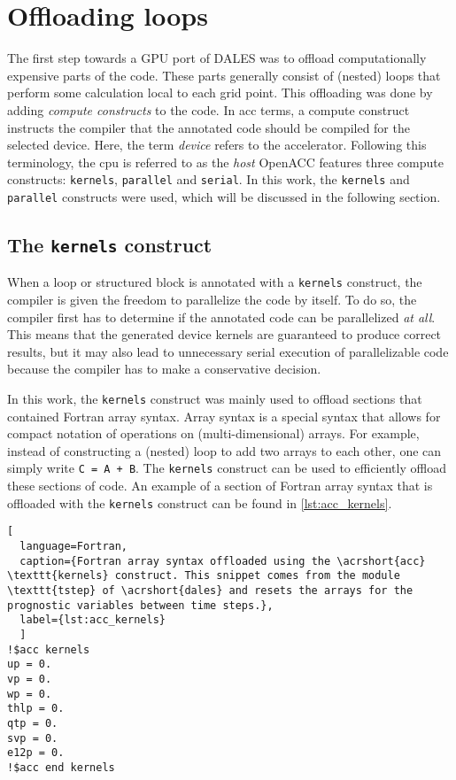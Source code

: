 \section{Offloading loops}
The first step towards a GPU port of DALES was to offload computationally expensive parts of the code. These parts generally consist of (nested) loops that perform some calculation local to each grid point. This offloading was done by adding \emph{compute constructs} to the code. In \acrshort{acc} terms, a compute construct instructs the compiler that the annotated code should be compiled for the selected device. Here, the term \emph{device} refers to the accelerator. Following this terminology, the \acrshort{cpu} is referred to as the \emph{host} OpenACC features three compute constructs: \texttt{kernels}, \texttt{parallel} and \texttt{serial}. In this work, the \texttt{kernels} and \texttt{parallel} constructs were used, which will be discussed in the following section.

\subsection{The \texttt{kernels} construct}
When a loop or structured block is annotated with a \texttt{kernels} construct, the compiler is given the freedom to parallelize the code by itself. To do so, the compiler first has to determine if the annotated code can be parallelized \emph{at all}. This means that the generated device kernels are guaranteed to produce correct results, but it may also lead to unnecessary serial execution of parallelizable code because the compiler has to make a conservative decision.

In this work, the \texttt{kernels} construct was mainly used to offload sections that contained Fortran array syntax. Array syntax is a special syntax that allows for compact notation of operations on (multi-dimensional) arrays. For example, instead of constructing a (nested) loop to add two arrays to each other, one can simply write \texttt{C = A + B}. The \texttt{kernels} construct can be used to efficiently offload these sections of code. An example of a section of Fortran array syntax that is offloaded with the \texttt{kernels} construct can be found in \autoref{lst:acc_kernels}.

\begin{lstlisting}[
  language=Fortran,
  caption={Fortran array syntax offloaded using the \acrshort{acc} \texttt{kernels} construct. This snippet comes from the module \texttt{tstep} of \acrshort{dales} and resets the arrays for the prognostic variables between time steps.},
  label={lst:acc_kernels}
  ]
!$acc kernels
up = 0.
vp = 0.
wp = 0.
thlp = 0.
qtp = 0.
svp = 0.
e12p = 0.
!$acc end kernels
\end{lstlisting}


